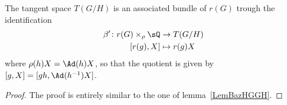 \begin{lemma}
The tangent space $T(G/H)$ is an associated bundle of $r(G)$ trough the identification
\begin{equation}
\begin{aligned}
 \beta'\colon r(G)\times_{\rho}\sQ&\to T(G/H) \\
  [r(g),X]&\mapsto r(g)X
\end{aligned}
\end{equation}
where $\rho(h)X=\Ad(h)X$, so that the quotient is given by $[g,X]=[gh,\Ad(h^{-1})X]$.
\end{lemma}

\begin{proof}
The proof is entirely similar to the one of lemma~\ref{LemBazHGGH}.
\end{proof}
